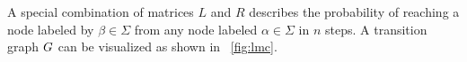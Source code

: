 A special combination of matrices $L$ and $R$ \cite{GartnerFW03} describes the probability of reaching a node labeled by $\beta\in\Sigma$ from any node labeled $\alpha\in\Sigma$ in $n$ steps. %
%
A transition graph $G$ can be visualized as shown in \figurename~\ref{fig:lmc}. %
%
